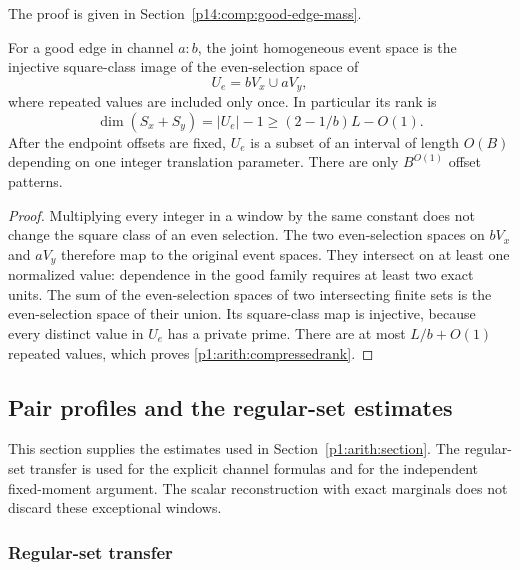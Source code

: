 The proof is given in Section~\ref{p14:comp:good-edge-mass}.

\begin{lemma}\label{p1:arith:compression}
For a good edge in channel $a:b$, the joint homogeneous event space is the
injective square-class image of the even-selection space of
\[
 U_e=bV_x\cup aV_y,
\]
where repeated values are included only once.  In particular its rank is
\begin{equation}\label{p1:arith:compressedrank}
 \dim(S_x+S_y)=|U_e|-1\geq(2-1/b)L-O(1).
\end{equation}
After the endpoint offsets are fixed, $U_e$ is a subset of an interval of
length $O(B)$ depending on one integer translation parameter.  There are
only $B^{O(1)}$ offset patterns.
\end{lemma}

\begin{proof}
Multiplying every integer in a window by the same constant does not change
the square class of an even selection.  The two even-selection spaces on
$bV_x$ and $aV_y$ therefore map to the original event spaces.  They intersect
on at least one normalized value: dependence in the good family requires
at least two exact units.  The sum of the even-selection spaces of two
intersecting finite sets is the even-selection space of their union.  Its
square-class map is injective, because every distinct value in $U_e$ has a
private prime.  There are at most $L/b+O(1)$ repeated values, which proves
\eqref{p1:arith:compressedrank}.
\end{proof}


\subsection{Pair profiles and the regular-set estimates}
\label{p14:comp:pair-profiles}

This section supplies the estimates used in Section~\ref{p1:arith:section}.
The regular-set transfer is used for the explicit channel formulas and for
the independent fixed-moment argument. The scalar reconstruction with exact marginals
does not discard these exceptional windows.

\subsubsection{Regular-set transfer}
\label{p14:comp:regular-transfer}


